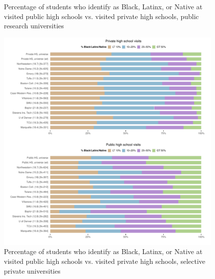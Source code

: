 \documentclass[
  12pt,
]{article}
\begin{document}
\begin{landscape}
\begin{figure}
{}

\caption{Percentage of students who identify as Black, Latinx, or Native at visited public high schools vs. visited private high schools, public research universities}\label{fig:race-pubu-privhs-pubhs}
\end{figure}

\newpage

\begin{figure}

{\centering \includegraphics[width=2\linewidth]{../assets/figures/ego_network_race_privu_privhs_pubhs} 

}

\caption{Percentage of students who identify as Black, Latinx, or Native at visited public high schools vs. visited private high schools, selective private universities}\label{fig:race-privu-privhs-pubhs}
\end{figure}

\newpage

\begin{figure}


\end{figure}
\end{landscape}
\end{document}
